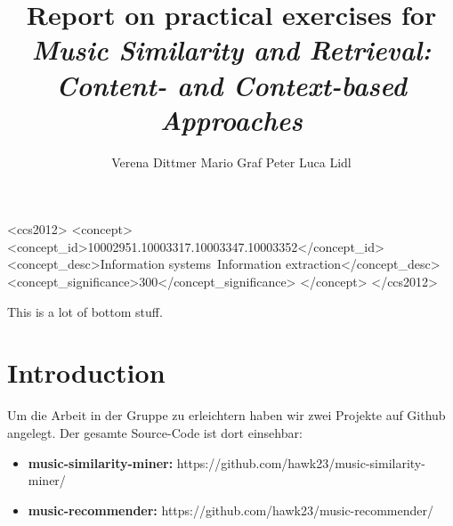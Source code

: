 \documentclass[prodmode,acmtecs]{acmsmall} %
\begin{document}

\title{Report on practical exercises for \emph{Music Similarity and Retrieval: Content- and Context-based Approaches}}
\author{
Verena Dittmer
Mario Graf
Peter Luca Lidl
}

%
%
\begin{CCSXML}
<ccs2012>
<concept>
<concept_id>10002951.10003317.10003347.10003352</concept_id>
<concept_desc>Information systems~Information extraction</concept_desc>
<concept_significance>300</concept_significance>
</concept>
</ccs2012>
\end{CCSXML}


%
%



\begin{bottomstuff}
This is a lot of bottom stuff.
\end{bottomstuff}

\maketitle


\section{Introduction}
Um die Arbeit in der Gruppe zu erleichtern haben wir zwei Projekte auf Github angelegt. Der gesamte Source-Code ist dort einsehbar:
\begin{itemize}
\item \textbf{music-similarity-miner: } https://github.com/hawk23/music-similarity-miner/
\item \textbf{music-recommender: } https://github.com/hawk23/music-recommender/
\end{itemize}
\end{document}

